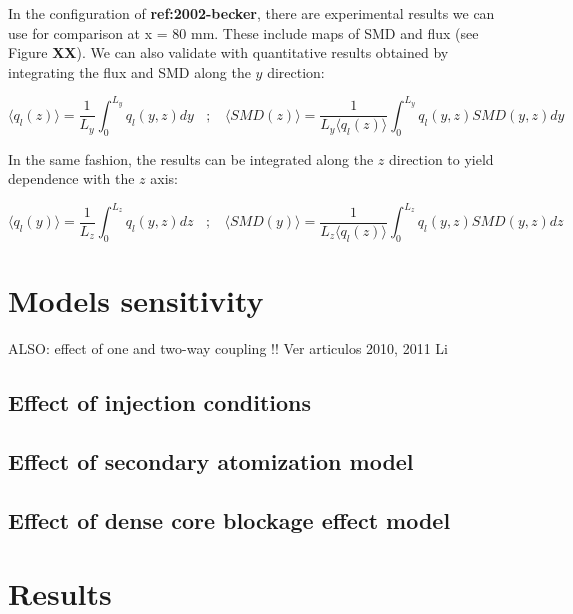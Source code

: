 In the configuration of \textbf{ref:2002-becker}, there are experimental results we can use for comparison at x = 80 mm. These include maps of SMD and flux (see Figure \textbf{XX}). We can also validate with quantitative results obtained by integrating the flux and SMD along the $y$ direction:

\begin{equation}
\langle q_l \left( z \right) \rangle = \frac{1}{L_y} \int_0^{L_y} q_l \left( y, z \right) dy ~~~~; ~~~~ \langle SMD \left( z \right) \rangle = \frac{1}{L_y \langle q_l \left( z \right) \rangle} \int_0^{L_y} q_l \left( y, z \right) SMD \left( y, z \right) dy
\end{equation}

In the same fashion, the results can be integrated along the $z$ direction to yield dependence with the $z$ axis:

\begin{equation}
\langle q_l \left( y \right) \rangle = \frac{1}{L_z} \int_0^{L_z} q_l \left( y, z \right) dz ~~~~; ~~~~ \langle SMD \left( y \right) \rangle = \frac{1}{L_z \langle q_l \left( z \right) \rangle} \int_0^{L_z} q_l \left( y, z \right) SMD \left( y, z \right) dz
\end{equation}


\section{Models sensitivity}

ALSO: effect of one and two-way coupling !! Ver articulos 2010, 2011 Li 

\subsection{Effect of injection conditions}

\subsection{Effect of secondary atomization model}

\subsection{Effect of dense core blockage effect model}

\section{Results}

